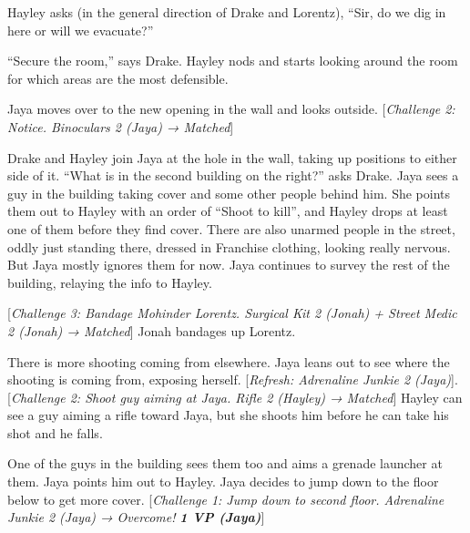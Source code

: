 Hayley asks (in the general direction of Drake and Lorentz), ``Sir, do we dig in here or will we evacuate?''

``Secure the room,'' says Drake.  Hayley nods and starts looking around the room for which areas are the most defensible.



Jaya moves over to the new opening in the wall and looks outside.  {[}\textit{Challenge 2: Notice.  Binoculars 2 (Jaya) → Matched}{]}



Drake and Hayley join Jaya at the hole in the wall, taking up positions to either side of it.  ``What is in the second building on the right?'' asks Drake.  Jaya sees a guy in the building taking cover and some other people behind him.  She points them out to Hayley with an order of ``Shoot to kill'', and Hayley drops at least one of them before they find cover. There are also unarmed people in the street, oddly just standing there, dressed in Franchise clothing, looking really nervous.  But Jaya mostly ignores them for now.  Jaya continues to survey the rest of the building, relaying the info to Hayley.



{[}\textit{Challenge 3: Bandage Mohinder Lorentz.  Surgical Kit 2 (Jonah) + Street Medic 2 (Jonah) → Matched}{]}  Jonah bandages up Lorentz.



There is more shooting coming from elsewhere.  Jaya leans out to see where the shooting is coming from, exposing herself.  {[}\textit{Refresh: Adrenaline Junkie 2 (Jaya)}{]}.  {[}\textit{Challenge 2: Shoot guy aiming at Jaya. Rifle 2 (Hayley) → Matched}{]}  Hayley can see a guy aiming a rifle toward Jaya, but she shoots him before he can take his shot and he falls.



One of the guys in the building sees them too and aims a grenade launcher at them.  Jaya points him out to Hayley.  Jaya decides to jump down to the floor below to get more cover.  {[}\textit{Challenge 1: Jump down to second floor.  Adrenaline Junkie 2 (Jaya)  → Overcome! }\textit{\textbf{1 VP (Jaya)}}{]}



